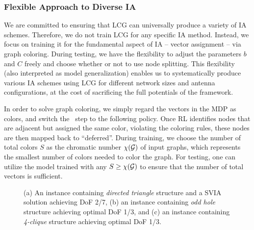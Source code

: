 \documentclass[a4paper,journal]{IEEEtran}
\begin{document}
\subsubsection{Flexible Approach to Diverse IA}
We are committed to ensuring that LCG can universally produce a variety of IA schemes. Therefore, we do not train LCG for any specific IA method. Instead, we focus on training it for the fundamental aspect of IA -- vector assignment -- via graph coloring. During testing, we have the flexibility to adjust the parameters $b$ and $C$ freely and choose whether or not to use node splitting. This flexibility (also interpreted as model generalization) enables us to systematically produce various IA schemes using LCG for different network sizes and antenna configurations, at the cost of sacrificing the full potentials of the framework.
 
In order to solve graph coloring, we simply regard the vectors in the MDP as colors, and switch the \cleanup\ step to the following policy. Once RL identifies nodes that are adjacent but assigned the same color, violating the coloring rules, these nodes are then mapped back to ``deferred''. During training, we choose the number of total colors $S$ as the chromatic number $\chi({\mathcal{G}})$ of input graphs, which represents the smallest number of colors needed to color the graph. For testing, one can utilize the model trained with any $S\geq \chi({\mathcal{G}})$ to ensure that the number of total vectors is sufficient.



\begin{figure*}
   \centering
     \hfil
        \hfil
        \hfil
   \caption{(a) An instance containing \textit{directed triangle} structure and a SVIA solution achieving DoF 2/7, (b) an instance containing \textit{odd hole} structure achieving optimal DoF 1/3, and (c) an instance containing \textit{4-clique} structure achieving optimal DoF 1/3.}
   \label{discussion_structure}
   \vspace{-20pt}
\end{figure*}
\end{document}
